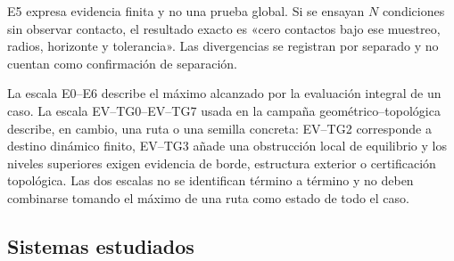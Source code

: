 \ifHAFOdigitalcontent
E5 expresa evidencia finita y no una prueba global. Si se ensayan \(N\)
condiciones sin observar contacto, el resultado exacto es «cero contactos bajo
ese muestreo, radios, horizonte y tolerancia». Las divergencias se registran
por separado y no cuentan como confirmación de separación.

La escala E0--E6 describe el máximo alcanzado por la evaluación integral de un
caso. La escala EV--TG0--EV--TG7 usada en la campaña
geométrico--topológica describe, en cambio, una ruta o una semilla concreta:
EV--TG2 corresponde a destino dinámico finito, EV--TG3 añade una obstrucción
local de equilibrio y los niveles superiores exigen evidencia de borde,
estructura exterior o certificación topológica. Las dos escalas no se
identifican término a término y no deben combinarse tomando el máximo de una
ruta como estado de todo el caso.
\fi

\subsection{Sistemas estudiados}

